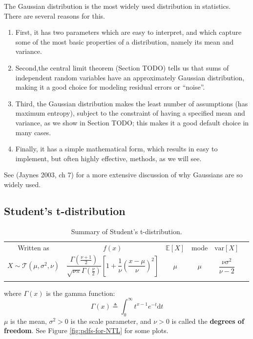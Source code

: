 \documentclass[graybox, envcountchap, twocolumn]{styles/svmult}
\begin{document}
The Gaussian distribution is the most widely used distribution in statistics. There are several reasons for this. 
\begin{enumerate}
\item First, it has two parameters which are easy to interpret, and which capture some of the most basic properties of a distribution, namely its mean and variance. 
\item Second,the central limit theorem (Section TODO) tells us that sums of independent random variables have an approximately Gaussian distribution, making it a good choice for modeling residual errors or “noise”. 
\item Third, the Gaussian distribution makes the least number of assumptions (has maximum entropy), subject to the constraint of having a specified mean and variance, as we show in Section TODO; this makes it a good default choice in many cases. 
\item Finally, it has a simple mathematical form, which results in easy to implement, but often highly effective, methods, as we will see. 
\end{enumerate}
See (Jaynes 2003, ch 7) for a more extensive discussion of why Gaussians are so widely used.


\subsection{Student's t-distribution}
\begin{table}
\caption{Summary of Student's t-distribution.}
\centering
\begin{tabular}{cccccc}
\hline\noalign{\smallskip}
Written as & $f(x)$ & $\mathbb{E}[X]$ & mode & $\text{var}[X]$ \\
\noalign{\smallskip}\svhline\noalign{\smallskip}
$X \sim \mathcal{T}(\mu,\sigma^2,\nu)$ & $\dfrac{\Gamma(\frac{\nu+1}{2})}{\sqrt{\nu\pi}\Gamma(\frac{\nu}{2})}\left[1+\dfrac{1}{\nu}\left(\dfrac{x-\mu}{\nu}\right)^2\right]$ & $\mu$ & $\mu$ & $\dfrac{\nu\sigma^2}{\nu-2}$ \\
\noalign{\smallskip}\hline
\end{tabular}
\end{table}
where  $\Gamma(x)$ is the gamma function:
\begin{equation}
\Gamma(x) \triangleq \int_0^\infty t^{x-1}e^{-t}\mathrm{d}t
\end{equation}
$\mu$ is the mean, $\sigma^2>0$ is the scale parameter, and $\nu>0$ is called the \textbf{degrees of freedom}. See Figure \ref{fig:pdfs-for-NTL} for some plots.
\end{document}
